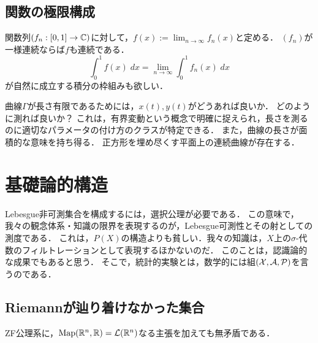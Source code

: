 \documentclass[uplatex, dvipdfmx]{jsreport}
\begin{document}
\subsection{関数の極限構成}

\begin{question}[連続関数の極限はどんな関数か？]
    関数列$(f_n:[0,1]\to\mathbb{C})$に対して，$f(x):=\lim_{n\to\infty}f_n(x)$と定める．
    $(f_n)$が一様連続ならば$f$も連続である．
    \[\int^1_0f(x)\;dx=\lim_{n\to\infty}\int^1_0f_n(x)\;dx\]
    が自然に成立する積分の枠組みも欲しい．
\end{question}

\begin{question}[曲線の長さとフラクタル]
    曲線$\Gamma$が長さ有限であるためには，$x(t),y(t)$がどうあれば良いか．
    どのように測れば良いか？
    これは，有界変動という概念で明確に捉えられ，長さを測るのに適切なパラメータの付け方のクラスが特定できる．
    また，曲線の長さが面積的な意味を持ち得る．
    正方形を埋め尽くす平面上の連続曲線が存在する．
\end{question}

\section{基礎論的構造}

\begin{tcolorbox}[colframe=ForestGreen, colback=ForestGreen!10!white,breakable,colbacktitle=ForestGreen!40!white,coltitle=black,fonttitle=\bfseries\sffamily,
title=]
    Lebesgue非可測集合を構成するには，選択公理が必要である．
    この意味で，我々の観念体系・知識の限界を表現するのが，Lebesgue可測性とその射としての測度である．
    これは，$P(X)$の構造よりも貧しい．我々の知識は，$X$上の$\sigma$-代数のフィルトレーションとして表現するほかないのだ．
    このことは，認識論的な成果でもあると思う．
    そこで，統計的実験とは，数学的には組$(\mathcal{X},\mathcal{A},\mathcal{P})$を言うのである．
\end{tcolorbox}

\subsection{Riemannが辿り着けなかった集合}

\begin{theorem}[Solovay, R. (1970).]
    ZF公理系に，$\mathrm{Map}(\mathbb{R}^n,\mathbb{R})=\mathcal{L}(\mathbb{R}^n)$なる主張を加えても無矛盾である．
\end{theorem}
\end{document}
